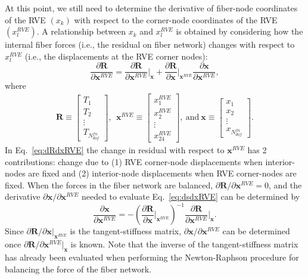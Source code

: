 \documentclass[12pt,aps,pre]{revtex4}
\begin{document}
At this point, we still need to determine the derivative of fiber-node coordinates of the RVE $(x_k)$ with respect to the corner-node coordinates of the RVE $(x_l^{RVE})$. A relationship between $x_k$ and $x_l^{RVE}$ is obtained by considering how the internal fiber forces (i.e., the residual on fiber network) changes with respect to $x_l^{RVE}$ (i.e., the displacements at the RVE corner nodes):
%
\begin{equation}
\frac{\partial \pmb{R}}{\partial \pmb{x}^{RVE}} = \frac{\partial \pmb{R}}{\partial \pmb{x}^{RVE}} \bigg |_{\pmb{x}} + \frac{\partial \pmb{R}}{\partial \pmb{x}} \bigg |_{\pmb{x}^{RVE}} \frac{\partial \pmb{x}}{\partial \pmb{x}^{RVE}},
\label{eq:dRdxRVE}
\end{equation}
%
where
%
\begin{eqnarray}
\pmb{R} \equiv \begin{bmatrix}
T_1 \\
T_2 \\
\vdots \\
T_{N_{dof}^{fn}}
\end{bmatrix}, \ \ 
%
\pmb{x}^{RVE} \equiv \begin{bmatrix}
x_1^{RVE} \\
x_2^{RVE} \\
\vdots \\
x_{24}^{RVE}
\end{bmatrix}, \ \text{and} \
%
\pmb{x} \equiv \begin{bmatrix}
x_1 \\
x_2 \\
\vdots \\
x_{N_{dof}^{fn}} 
\end{bmatrix} .
\end{eqnarray}
%
In Eq.\ \eqref{eq:dRdxRVE} the change in residual with respect to $\pmb{x}^{RVE}$ has 2 contributions: change due to (1) RVE corner-node displacements when interior-nodes are fixed and (2) interior-node displacements when RVE corner-nodes  are fixed. When the forces in the fiber network are balanced, $\partial \pmb{R}/\partial \pmb{x}^{RVE} = 0$, and the derivative $\partial \pmb{x}/\partial \pmb{x}^{RVE}$ needed to evaluate Eq.\ \eqref{eq:dsdxRVE} can be determined by
%
\begin{equation}
\frac{\partial \pmb{x}}{\partial \pmb{x}^{RVE}} = -\left(\frac{\partial \pmb{R}}{\partial \pmb{x}} \bigg |_{\pmb{x}^{RVE}}\right)^{-1}\frac{\partial \pmb{R}}{\partial \pmb{x}^{RVE}}\bigg |_{\pmb{x}} .
\end{equation}
%
Since $\partial \pmb{R}/\partial \pmb{x} |_{\pmb{x}^{RVE}}$ is the tangent-stiffness matrix, $\partial \pmb{x}/\partial \pmb{x}^{RVE}$ can be determined once $\partial \pmb{R}/\partial \pmb{x}^{RVE} |_{\pmb{x}}$ is known. Note that the inverse of the tangent-stiffness matrix has already been evaluated when performing the Newton-Raphson procedure for balancing the force of the fiber network.
\end{document}
